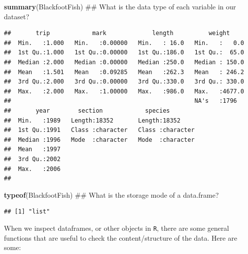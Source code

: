 \documentclass[]{article}
\newenvironment{Shaded}{\begin{snugshade}}{\end{snugshade}}
\newcommand{\KeywordTok}[1]{\textcolor[rgb]{0.13,0.29,0.53}{\textbf{#1}}}
\newcommand{\NormalTok}[1]{#1}
\begin{document}
\newpage 

\begin{Shaded}
\begin{Highlighting}[]
\KeywordTok{summary}\NormalTok{(BlackfootFish)  ## What is the data type of each variable in our dataset?}
\end{Highlighting}
\end{Shaded}

\begin{verbatim}
##       trip            mark             length          weight      
##  Min.   :1.000   Min.   :0.00000   Min.   : 16.0   Min.   :   0.0  
##  1st Qu.:1.000   1st Qu.:0.00000   1st Qu.:186.0   1st Qu.:  65.0  
##  Median :2.000   Median :0.00000   Median :250.0   Median : 150.0  
##  Mean   :1.501   Mean   :0.09285   Mean   :262.3   Mean   : 246.2  
##  3rd Qu.:2.000   3rd Qu.:0.00000   3rd Qu.:330.0   3rd Qu.: 330.0  
##  Max.   :2.000   Max.   :1.00000   Max.   :986.0   Max.   :4677.0  
##                                                    NA's   :1796    
##       year        section            species         
##  Min.   :1989   Length:18352       Length:18352      
##  1st Qu.:1991   Class :character   Class :character  
##  Median :1996   Mode  :character   Mode  :character  
##  Mean   :1997                                        
##  3rd Qu.:2002                                        
##  Max.   :2006                                        
## 
\end{verbatim}

\begin{Shaded}
\begin{Highlighting}[]
\KeywordTok{typeof}\NormalTok{(BlackfootFish)  ## What is the storage mode of a data.frame?}
\end{Highlighting}
\end{Shaded}

\begin{verbatim}
## [1] "list"
\end{verbatim}

\vspace{0.5cm}

When we inspect dataframes, or other objects in \texttt{R}, there are
some general functions that are useful to check the content/structure of
the data. Here are some:
\end{document}
